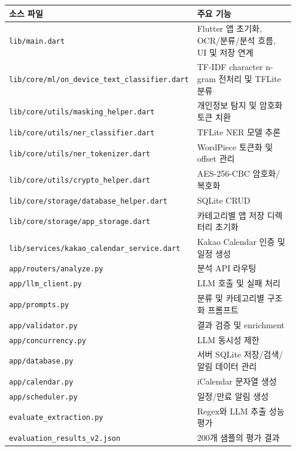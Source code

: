 \documentclass[11pt,a4paper]{article}
\begin{document}
\begingroup
\renewcommand{\arraystretch}{1.25}
\begin{longtable}{>{\raggedright\arraybackslash\small}p{0.44\linewidth} >{\raggedright\arraybackslash\small}p{0.51\linewidth}}
\toprule
\textbf{소스 파일} & \textbf{주요 기능}\\
\midrule
\texttt{lib/main.dart} & Flutter 앱 초기화, OCR/분류/분석 흐름, UI 및 저장 연계\\
\texttt{lib/\allowbreak core/\allowbreak ml/\allowbreak on\_device\_\allowbreak text\_classifier.dart} & TF-IDF character n-gram 전처리 및 TFLite 분류\\
\texttt{lib/\allowbreak core/\allowbreak utils/\allowbreak masking\_helper.dart} & 개인정보 탐지 및 암호화 토큰 치환\\
\texttt{lib/\allowbreak core/\allowbreak utils/\allowbreak ner\_classifier.dart} & TFLite NER 모델 추론\\
\texttt{lib/\allowbreak core/\allowbreak utils/\allowbreak ner\_tokenizer.dart} & WordPiece 토큰화 및 offset 관리\\
\texttt{lib/\allowbreak core/\allowbreak utils/\allowbreak crypto\_helper.dart} & AES-256-CBC 암호화/복호화\\
\texttt{lib/\allowbreak core/\allowbreak storage/\allowbreak database\_helper.dart} & SQLite CRUD\\
\texttt{lib/\allowbreak core/\allowbreak storage/\allowbreak app\_storage.dart} & 카테고리별 앱 저장 디렉터리 초기화\\
\texttt{lib/\allowbreak services/\allowbreak kakao\_calendar\_\allowbreak service.dart} & Kakao Calendar 인증 및 일정 생성\\
\texttt{app/\allowbreak routers/\allowbreak analyze.py} & 분석 API 라우팅\\
\texttt{app/\allowbreak llm\_client.py} & LLM 호출 및 실패 처리\\
\texttt{app/\allowbreak prompts.py} & 분류 및 카테고리별 구조화 프롬프트\\
\texttt{app/\allowbreak validator.py} & 결과 검증 및 enrichment\\
\texttt{app/\allowbreak concurrency.py} & LLM 동시성 제한\\
\texttt{app/\allowbreak database.py} & 서버 SQLite 저장/검색/알림 데이터 관리\\
\texttt{app/\allowbreak calendar.py} & iCalendar 문자열 생성\\
\texttt{app/\allowbreak scheduler.py} & 일정/만료 알림 생성\\
\texttt{evaluate\_\allowbreak extraction.py} & Regex와 LLM 추출 성능 평가\\
\texttt{evaluation\_\allowbreak results\_\allowbreak v2.json} & 200개 샘플의 평가 결과\\
\bottomrule
\end{longtable}
\endgroup
\end{document}
